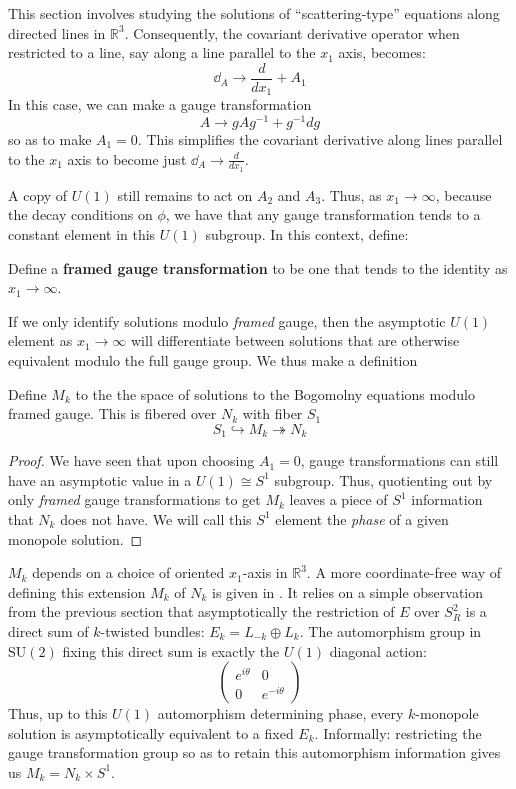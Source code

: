 	This section involves studying the solutions of ``scattering-type'' equations along directed lines in $\mathbb R^3$. Consequently, the covariant derivative operator when restricted to a line, say along a line parallel to the $x_1$ axis, becomes:
	\begin{equation}
		\dd_A \to \frac{d}{dx_1} + A_1
	\end{equation}
	In this case, we can make a gauge transformation
	$$A \to g A g^{-1} + g^{-1} dg$$
	so as to make $A_1 = 0$. This simplifies the covariant derivative along lines parallel to the $x_1$ axis to become just $\dd_A \to \frac{d}{dx_1}$.
	
	A copy of $U(1)$ still remains to act on $A_2$ and $A_3$. Thus, as $x_1 \to \infty$, because the decay conditions on $\phi$, we have that any gauge transformation tends to a constant element in this $U(1)$ subgroup. In this context, define:
	\begin{defn}[Framing]
		Define a \textbf{framed gauge transformation} \cite{hitchin1983, nakajima1993} to be one that tends to the identity as $x_1 \to \infty$.
	\end{defn}
	If we only identify solutions modulo \emph{framed} gauge, then the asymptotic $U(1)$ element as $x_1 \to \infty$ will differentiate between solutions that are otherwise equivalent modulo the full gauge group. We thus make a definition
	\begin{defn}
		Define $M_k$ to the the space of solutions to the Bogomolny equations modulo framed gauge. This is fibered over $N_k$ with fiber $S_1$
		$$S_1 \hookrightarrow M_k \twoheadrightarrow N_k$$
	\end{defn}
	\begin{proof}
		We have seen that upon choosing $A_1 = 0$, gauge transformations can still have an asymptotic value in a $U(1) \cong S^1$ subgroup. Thus, quotienting out by only \emph{framed} gauge transformations to get $M_k$ leaves a piece of $S^1$ information that $N_k$ does not have. We will call this $S^1$ element the \emph{phase} of a given monopole solution. 
	\end{proof}
	\begin{nb}
		$M_k$ depends on a choice of oriented $x_1$-axis in $\mathbb R^3$. A more coordinate-free way of defining this extension $M_k$ of $N_k$ is given in \cite{atiyahhitchin1988}. It relies on a simple observation from the previous section that asymptotically the restriction of $E$ over $S^2_R$ is a direct sum of $k$-twisted bundles: $E_k = L_{-k} \oplus L_{k}$. The automorphism group in $\mathrm{SU}(2)$ fixing this direct sum is exactly the $U(1)$ diagonal action:
		\begin{equation*}
			\begin{pmatrix}
				e^{i\theta} & 0 \\
				0 & e^{-i\theta}
			\end{pmatrix}
		\end{equation*}
		Thus, up to this $U(1)$ automorphism determining phase, every $k$-monopole solution is asymptotically equivalent to a fixed $E_k$. Informally: restricting the gauge transformation group so as to retain this automorphism information gives us $M_k = N_k \times S^1$.
	\end{nb}
